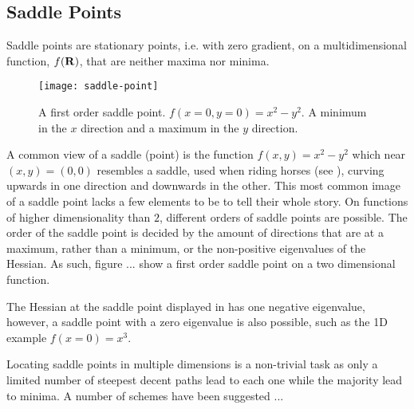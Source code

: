 \subsection{Saddle Points}
\label{sec:sps}

Saddle points are stationary points, i.e. with zero gradient, on a multidimensional function, $f({\mathrm{\mathbf{\bm{R}}}})$, that are neither maxima nor minima.

\begin{figure}
  \begin{center}
    \texttt{[image: saddle-point]}
    \parbox{0.85\linewidth}{
      \caption{A first order saddle point.
      $f(x=0, y=0) = x^2 - y^2$. A minimum in the $x$ direction and a maximum in the $y$ direction.
      }}
    \label{fig:saddle-point}
  \end{center}
\end{figure}

A common view of a saddle (point) is the function $f(x, y) = x^2 - y^2$ which near $(x,y) = (0,0)$ resembles a saddle, used when riding horses (see ), curving upwards in one direction and downwards in the other.
This most common image of a saddle point lacks a few elements to be to tell their whole story.
On functions of higher dimensionality than $2$, different orders of saddle points are possible.
The order of the saddle point is decided by the amount of directions that are at a maximum, rather than a minimum, or the non-positive eigenvalues of the Hessian.
As such, figure ... show a first order saddle point on a two dimensional function.

The Hessian at the saddle point displayed in  has one negative eigenvalue, however, a saddle point with a zero eigenvalue is also possible, such as the 1D example $f(x = 0) = x^3$. 

Locating saddle points in multiple dimensions is a non-trivial task as only a limited number of steepest decent paths lead to each one while the majority lead to minima.
A number of schemes have been suggested ...

\recent

\incomplete
